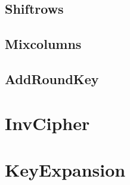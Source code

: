 \documentclass{article}
\begin{document}
\subsection{Shiftrows}


\subsection{Mixcolumns}


\subsection{AddRoundKey}


\newpage
\section{InvCipher}

\newpage
\section{KeyExpansion}
\end{document}
